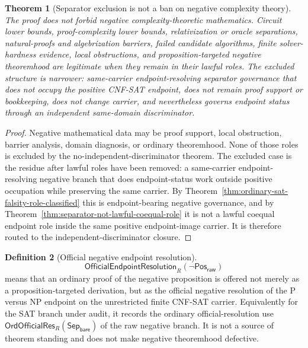 \documentclass[11pt]{article}
\newtheorem{theorem}{Theorem}[section]
\theoremstyle{definition}
\newtheorem{definition}[theorem]{Definition}
\theoremstyle{remark}
\newcommand{\PosRaw}{\mathsf{Pos}_{\mathsf{raw}}}
\newcommand{\SepBare}{\mathsf{Sep}_{\mathsf{bare}}}
\newcommand{\OfficialEndpointResolution}{\mathsf{OfficialEndpointResolution}}
\newcommand{\OrdOfficialRes}{\mathsf{OrdOfficialRes}}
\begin{document}
\begin{theorem}[Separator exclusion is not a ban on negative complexity theory]\label{thm:negative-complexity-not-globally-forbidden}
The proof does not forbid negative complexity-theoretic mathematics. Circuit lower bounds, proof-complexity lower bounds, relativization or oracle separations, natural-proofs and algebrization barriers, failed candidate algorithms, finite solver-hardness evidence, local obstructions, and proposition-targeted negative theoremhood are legitimate when they remain in their lawful roles. The excluded structure is narrower: same-carrier endpoint-resolving separator governance that does not occupy the positive CNF-SAT endpoint, does not remain proof support or bookkeeping, does not change carrier, and nevertheless governs endpoint status through an independent same-domain discriminator.
\end{theorem}

\begin{proof}
Negative mathematical data may be proof support, local obstruction, barrier analysis, domain diagnosis, or ordinary theoremhood. None of those roles is excluded by the no-independent-discriminator theorem. The excluded case is the residue after lawful roles have been removed: a same-carrier endpoint-resolving negative branch that does endpoint-status work outside positive occupation while preserving the same carrier. By Theorem~\ref{thm:ordinary-sat-falsity-role-classified} this is endpoint-bearing negative governance, and by Theorem~\ref{thm:separator-not-lawful-coequal-role} it is not a lawful coequal endpoint role inside the same positive endpoint-image carrier. It is therefore routed to the independent-discriminator closure.
\end{proof}

\begin{definition}[Official negative endpoint resolution]\label{def:official-negative-endpoint-resolution}
\[
  \OfficialEndpointResolution_R(\neg\PosRaw)
\]
means that an ordinary proof of the negative proposition is offered not merely as a proposition-targeted derivation, but as the official negative resolution of the P versus NP endpoint on the unrestricted finite CNF-SAT carrier. Equivalently for the SAT branch under audit, it records the ordinary official-resolution use \(\OrdOfficialRes_R(\SepBare)\) of the raw negative branch. It is not a source of theorem standing and does not make negative theoremhood defective.
\end{definition}
\end{document}

